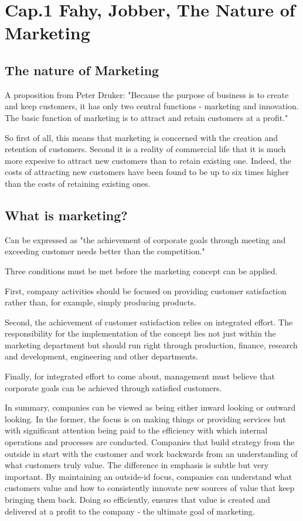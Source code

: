\documentclass{article}
\begin{document}
\section{Cap.1 Fahy, Jobber, The Nature of Marketing}

\subsection{The nature of Marketing}
A proposition from Peter Druker: "Because the purpose of business is to create and keep customers, it has only two central functions - marketing and innovation. The basic function of marketing is to attract and retain customers at a profit."

So first of all, this means that marketing is concerned with the creation and retention of customers. Second it is a reality of commercial life that it is much more expesive to attract new customers than to retain existing one. Indeed, the costs of attracting new customers have been found to be up to six times higher than the costs of retaining existing ones.

\subsection{What is marketing?}
Can be expressed as "the achievement of corporate goals through meeting and exceeding customer needs better than the competition." 

Three conditions must be met before the marketing concept can be applied. 

First, company activities should be focused on providing customer satisfaction rather than, for example, simply producing products. 

Second, the achievement of customer satisfaction relies on integrated effort. The responsibility for the implementation of the concept lies not just within the marketing department but should run right through production, finance, research and development, engineering and other departments. 

Finally, for integrated effort to come about, management must believe that corporate goals can be achieved through satisfied customers. 

In summary, companies can be viewed as being either inward looking or outward looking. In the former, the focus is on making things or providing services but with significant attention being paid to the efficiency with which internal operations and processes are conducted. Companies that build strategy from the outside in start with the customer and work backwards from an understanding of what customers truly value. The difference in emphasis is subtle but very important. By maintaining an outside-id focus, companies can understand what customers value and how to consistently innovate new sources of value that keep bringing them back. Doing so efficiently, ensures that value is created and delivered at a profit to the company - the ultimate goal of marketing. 
\end{document}
